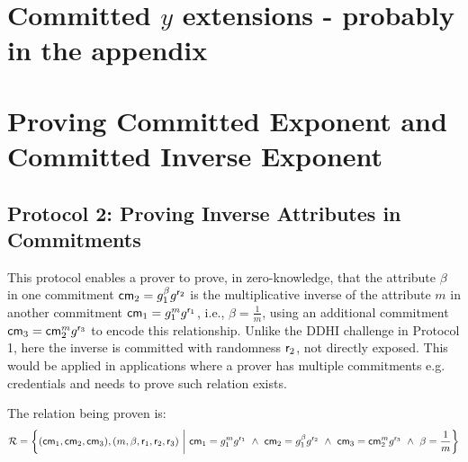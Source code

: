 \newpage
\section{Committed $y$ extensions - probably in the appendix}

\section{Proving Committed Exponent and Committed Inverse Exponent}

\subsection*{Protocol 2: Proving Inverse Attributes in Commitments}
This protocol enables a prover to prove, in zero-knowledge, that the attribute $\beta$ in one commitment $\mathsf{cm}_2 = g_1^\beta g^{\mathsf{r}_2}$ is the multiplicative inverse of the attribute $m$ in another commitment $\mathsf{cm}_1 = g_1^m g^{\mathsf{r}_1}$, i.e., $\beta = \frac{1}{m}$, using an additional commitment $\mathsf{cm}_3 = \mathsf{cm}_2^m g^{\mathsf{r}_3}$ to encode this relationship. Unlike the DDHI challenge in Protocol 1, here the inverse is committed with randomness $\mathsf{r}_2$, not directly exposed. This would be applied in applications where a prover has multiple commitments e.g. credentials and needs to prove such relation exists.

The relation being proven is:
\[
\mathcal{R} = \left\{ (\cm_1, \cm_2, \cm_3), (m, \beta, \usk_1, \usk_2, \usk_3) \ \middle|\ \cm_1 = g_1^m g^{\usk_1} \ \land\ \cm_2 = g_1^\beta g^{\usk_2} \ \land\ \cm_3 = \cm_2^m g^{\usk_3} \ \land\ \beta = \frac{1}{m} \right\}
\]

